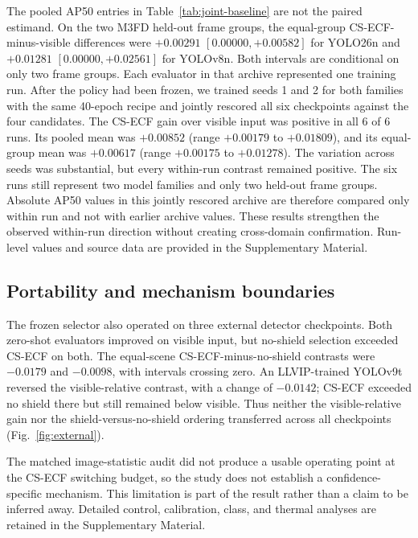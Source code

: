 The pooled AP50 entries in Table~\ref{tab:joint-baseline} are not the paired
estimand. On the two M3FD held-out frame groups, the equal-group
CS-ECF-minus-visible differences were \(+0.00291\) \([0.00000,+0.00582]\) for
YOLO26n and \(+0.01281\) \([0.00000,+0.02561]\) for YOLOv8n. Both intervals
are conditional on only two frame groups. Each evaluator in that archive
represented one training run. After the policy had been frozen, we trained
seeds 1 and 2 for both families with the same 40-epoch recipe and jointly
rescored all six checkpoints against the four candidates. The CS-ECF gain over
visible input was positive in all 6 of 6 runs. Its pooled mean was \(+0.00852\)
(range \(+0.00179\) to \(+0.01809\)), and its equal-group mean was \(+0.00617\)
(range \(+0.00175\) to \(+0.01278\)). The variation across seeds was
substantial, but every within-run contrast remained positive. The six runs
still represent two model families and only two held-out frame groups. Absolute
AP50 values in this jointly rescored archive are therefore compared only within
run and not with earlier archive values. These results strengthen the observed
within-run direction without creating cross-domain confirmation.
Run-level values and source data are provided in the Supplementary Material.

\subsection{Portability and mechanism boundaries}

The frozen selector also operated on three external detector checkpoints.
Both zero-shot evaluators improved on visible input, but no-shield selection
exceeded CS-ECF on both. The equal-scene CS-ECF-minus-no-shield contrasts were
\(-0.0179\) and \(-0.0098\), with intervals crossing zero. An LLVIP-trained
YOLOv9t reversed the visible-relative contrast, with a change of \(-0.0142\);
CS-ECF exceeded no shield there but still remained below visible. Thus neither
the visible-relative gain nor the shield-versus-no-shield ordering transferred
across all checkpoints (Fig.~\ref{fig:external}).

The matched image-statistic audit did not produce a usable operating point at
the CS-ECF switching budget, so the study does not establish a
confidence-specific mechanism. This limitation is part of the result rather
than a claim to be inferred away. Detailed control, calibration, class, and
thermal analyses are retained in the Supplementary Material.

